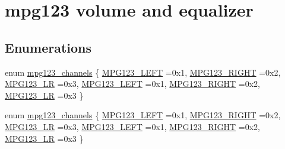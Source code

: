 \hypertarget{group__mpg123__voleq}{}\section{mpg123 volume and equalizer}
\label{group__mpg123__voleq}
\subsection*{Enumerations}
\begin{DoxyCompactItemize}
\item 
enum \hyperlink{group__mpg123__voleq_gaf6ae0d8c593d295c36e7d20e9f892840}{mpg123\+\_\+channels} \{ \newline
\hyperlink{group__mpg123__voleq_ggaf6ae0d8c593d295c36e7d20e9f892840a0442a02c69eba4474b27d271da00478a}{M\+P\+G123\+\_\+\+L\+E\+FT} =0x1, 
\hyperlink{group__mpg123__voleq_ggaf6ae0d8c593d295c36e7d20e9f892840a15ced0bea77e48f6e23d15410058d543}{M\+P\+G123\+\_\+\+R\+I\+G\+HT} =0x2, 
\hyperlink{group__mpg123__voleq_ggaf6ae0d8c593d295c36e7d20e9f892840ab3dd5fa5351f27c4678e30013fceee2b}{M\+P\+G123\+\_\+\+LR} =0x3, 
\hyperlink{group__mpg123__voleq_ggaf6ae0d8c593d295c36e7d20e9f892840a0442a02c69eba4474b27d271da00478a}{M\+P\+G123\+\_\+\+L\+E\+FT} =0x1, 
\newline
\hyperlink{group__mpg123__voleq_ggaf6ae0d8c593d295c36e7d20e9f892840a15ced0bea77e48f6e23d15410058d543}{M\+P\+G123\+\_\+\+R\+I\+G\+HT} =0x2, 
\hyperlink{group__mpg123__voleq_ggaf6ae0d8c593d295c36e7d20e9f892840ab3dd5fa5351f27c4678e30013fceee2b}{M\+P\+G123\+\_\+\+LR} =0x3
 \}
\item 
enum \hyperlink{group__mpg123__voleq_gaf6ae0d8c593d295c36e7d20e9f892840}{mpg123\+\_\+channels} \{ \newline
\hyperlink{group__mpg123__voleq_ggaf6ae0d8c593d295c36e7d20e9f892840a0442a02c69eba4474b27d271da00478a}{M\+P\+G123\+\_\+\+L\+E\+FT} =0x1, 
\hyperlink{group__mpg123__voleq_ggaf6ae0d8c593d295c36e7d20e9f892840a15ced0bea77e48f6e23d15410058d543}{M\+P\+G123\+\_\+\+R\+I\+G\+HT} =0x2, 
\hyperlink{group__mpg123__voleq_ggaf6ae0d8c593d295c36e7d20e9f892840ab3dd5fa5351f27c4678e30013fceee2b}{M\+P\+G123\+\_\+\+LR} =0x3, 
\hyperlink{group__mpg123__voleq_ggaf6ae0d8c593d295c36e7d20e9f892840a0442a02c69eba4474b27d271da00478a}{M\+P\+G123\+\_\+\+L\+E\+FT} =0x1, 
\newline
\hyperlink{group__mpg123__voleq_ggaf6ae0d8c593d295c36e7d20e9f892840a15ced0bea77e48f6e23d15410058d543}{M\+P\+G123\+\_\+\+R\+I\+G\+HT} =0x2, 
\hyperlink{group__mpg123__voleq_ggaf6ae0d8c593d295c36e7d20e9f892840ab3dd5fa5351f27c4678e30013fceee2b}{M\+P\+G123\+\_\+\+LR} =0x3
 \}
\end{DoxyCompactItemize}
